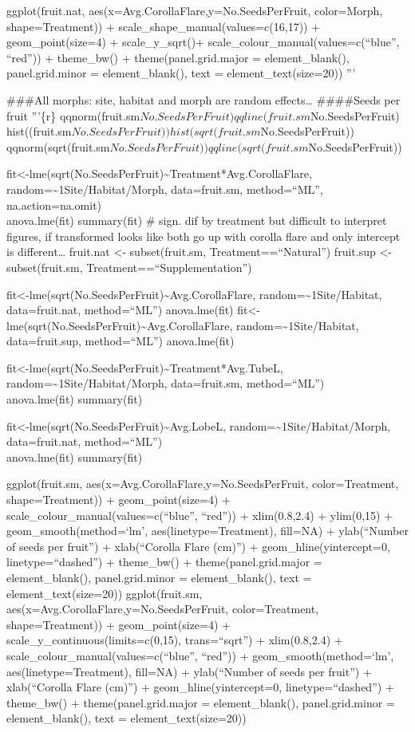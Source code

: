 \documentclass[]{article}
\begin{document}
ggplot(fruit.nat, aes(x=Avg.CorollaFlare,y=No.SeedsPerFruit,
color=Morph, shape=Treatment)) + scale\_shape\_manual(values=c(16,17)) +
geom\_point(size=4) + scale\_y\_sqrt()+
scale\_colour\_manual(values=c(``blue'', ``red'')) + theme\_bw() +
theme(panel.grid.major = element\_blank(), panel.grid.minor =
element\_blank(), text = element\_text(size=20)) '''

\#\#\#All morphs: site, habitat and morph are random effects\ldots{}
\#\#\#\#Seeds per fruit '''\{r\}
qqnorm(fruit.sm\(No.SeedsPerFruit) qqline(fruit.sm\)No.SeedsPerFruit)
hist((fruit.sm\(No.SeedsPerFruit)) hist(sqrt(fruit.sm\)No.SeedsPerFruit))
qqnorm(sqrt(fruit.sm\(No.SeedsPerFruit)) qqline(sqrt(fruit.sm\)No.SeedsPerFruit))

fit\textless{}-lme(sqrt(No.SeedsPerFruit)\textasciitilde{}Treatment*Avg.CorollaFlare,
random=\textasciitilde{}1\textbar{}Site/Habitat/Morph, data=fruit.sm,
method=``ML'', na.action=na.omit)\\
anova.lme(fit) summary(fit) \# sign. dif by treatment but difficult to
interpret figures, if transformed looks like both go up with corolla
flare and only intercept is different\ldots{} fruit.nat \textless{}-
subset(fruit.sm, Treatment==``Natural'') fruit.sup \textless{}-
subset(fruit.sm, Treatment==``Supplementation'')

fit\textless{}-lme(sqrt(No.SeedsPerFruit)\textasciitilde{}Avg.CorollaFlare,
random=\textasciitilde{}1\textbar{}Site/Habitat, data=fruit.nat,
method=``ML'') anova.lme(fit)
fit\textless{}-lme(sqrt(No.SeedsPerFruit)\textasciitilde{}Avg.CorollaFlare,
random=\textasciitilde{}1\textbar{}Site/Habitat, data=fruit.sup,
method=``ML'') anova.lme(fit)

fit\textless{}-lme(sqrt(No.SeedsPerFruit)\textasciitilde{}Treatment*Avg.TubeL,
random=\textasciitilde{}1\textbar{}Site/Habitat/Morph, data=fruit.sm,
method=``ML'')\\
anova.lme(fit) summary(fit)

fit\textless{}-lme(sqrt(No.SeedsPerFruit)\textasciitilde{}Avg.LobeL,
random=\textasciitilde{}1\textbar{}Site/Habitat/Morph, data=fruit.nat,
method=``ML'')\\
anova.lme(fit) summary(fit)

ggplot(fruit.sm, aes(x=Avg.CorollaFlare,y=No.SeedsPerFruit,
color=Treatment, shape=Treatment)) + geom\_point(size=4) +
scale\_colour\_manual(values=c(``blue'', ``red'')) + xlim(0.8,2.4) +
ylim(0,15) + geom\_smooth(method=`lm', aes(linetype=Treatment), fill=NA)
+ ylab(``Number of seeds per fruit'') + xlab(``Corolla Flare (cm)'') +
geom\_hline(yintercept=0, linetype=``dashed'') + theme\_bw() +
theme(panel.grid.major = element\_blank(), panel.grid.minor =
element\_blank(), text = element\_text(size=20)) ggplot(fruit.sm,
aes(x=Avg.CorollaFlare,y=No.SeedsPerFruit, color=Treatment,
shape=Treatment)) + geom\_point(size=4) +
scale\_y\_continuous(limits=c(0,15), trans=``sqrt'') + xlim(0.8,2.4) +
scale\_colour\_manual(values=c(``blue'', ``red'')) +
geom\_smooth(method=`lm', aes(linetype=Treatment), fill=NA) +
ylab(``Number of seeds per fruit'') + xlab(``Corolla Flare (cm)'') +
geom\_hline(yintercept=0, linetype=``dashed'') + theme\_bw() +
theme(panel.grid.major = element\_blank(), panel.grid.minor =
element\_blank(), text = element\_text(size=20))
\end{document}
